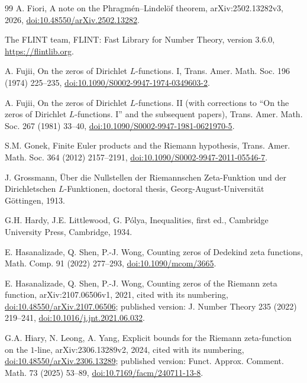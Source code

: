 \documentclass[11pt,a4paper]{article}
\numberwithin{equation}{section}
\theoremstyle{definition}
\theoremstyle{remark}
\begin{document}
\begin{thebibliography}{99}
 A. Fiori, A note on the Phragm\'en--Lindel\"of theorem, arXiv:2502.13282v3, 2026, \href{https://doi.org/10.48550/arXiv.2502.13282}{doi:10.48550/arXiv.2502.13282}.

 The FLINT team, FLINT: Fast Library for Number Theory, version 3.6.0, \url{https://flintlib.org}.

 A. Fujii, On the zeros of Dirichlet $L$-functions. I, Trans. Amer. Math. Soc. 196 (1974) 225--235, \href{https://doi.org/10.1090/S0002-9947-1974-0349603-2}{doi:10.1090/S0002-9947-1974-0349603-2}.

 A. Fujii, On the zeros of Dirichlet $L$-functions. II (with corrections to ``On the zeros of Dirichlet $L$-functions. I'' and the subsequent papers), Trans. Amer. Math. Soc. 267 (1981) 33--40, \href{https://doi.org/10.1090/S0002-9947-1981-0621970-5}{doi:10.1090/S0002-9947-1981-0621970-5}.

 S.M. Gonek, Finite Euler products and the Riemann hypothesis, Trans. Amer. Math. Soc. 364 (2012) 2157--2191, \href{https://doi.org/10.1090/S0002-9947-2011-05546-7}{doi:10.1090/S0002-9947-2011-05546-7}.

 J. Grossmann, \"Uber die Nullstellen der Riemannschen Zeta-Funktion und der Dirichletschen $L$-Funktionen, doctoral thesis, Georg-August-Universit\"at G\"ottingen, 1913.

 G.H. Hardy, J.E. Littlewood, G. P\'olya, Inequalities, first ed., Cambridge University Press, Cambridge, 1934.

 E. Hasanalizade, Q. Shen, P.-J. Wong, Counting zeros of Dedekind zeta functions, Math. Comp. 91 (2022) 277--293, \href{https://doi.org/10.1090/mcom/3665}{doi:10.1090/mcom/3665}.

 E. Hasanalizade, Q. Shen, P.-J. Wong, Counting zeros of the Riemann zeta function, arXiv:2107.06506v1, 2021, cited with its numbering, \href{https://doi.org/10.48550/arXiv.2107.06506}{doi:10.48550/arXiv.2107.06506}; published version: J. Number Theory 235 (2022) 219--241, \href{https://doi.org/10.1016/j.jnt.2021.06.032}{doi:10.1016/j.jnt.2021.06.032}.

 G.A. Hiary, N. Leong, A. Yang, Explicit bounds for the Riemann zeta-function on the $1$-line, arXiv:2306.13289v2, 2024, cited with its numbering, \href{https://doi.org/10.48550/arXiv.2306.13289}{doi:10.48550/arXiv.2306.13289}; published version: Funct. Approx. Comment. Math. 73 (2025) 53--89, \href{https://doi.org/10.7169/facm/240711-13-8}{doi:10.7169/facm/240711-13-8}.


\end{thebibliography}
\end{document}
